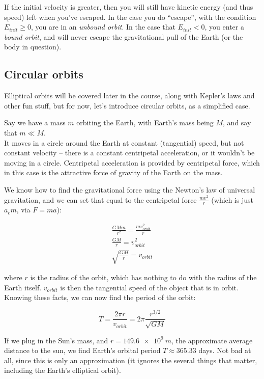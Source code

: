 If the initial velocity is greater, then you will still have kinetic energy (and thus speed) left when you've escaped. In the case you do ``escape'', with the condition $E_{init} \ge 0$, you are in an \emph{unbound orbit}. In the case that $E_{init} < 0$, you enter a \emph{bound orbit}, and will never escape the gravitational pull of the Earth (or the body in question).

\subsection{Circular orbits}

Elliptical orbits will be covered later in the course, along with Kepler's laws and other fun stuff, but for now, let's introduce circular orbits, as a simplified case.

Say we have a mass $m$ orbiting the Earth, with Earth's mass being $M$, and say that $m \ll M$.\\
It moves in a circle around the Earth at constant (tangential) speed, but not constant velocity -- there is a constant centripetal acceleration, or it wouldn't be moving in a circle. Centripetal acceleration is provided by centripetal force, which in this case is the attractive force of gravity of the Earth on the mass.

We know how to find the gravitational force using the Newton's law of universal gravitation, and we can set that equal to the centripetal force $\frac{m v^2}{r}$ (which is just $a_c m$, via $F = m a$):

\begin{align}
\frac{G M m}{r^2} = \frac{m v_{orbit}^2}{r}\\
\frac{G M}{r} = v_{orbit}^2\\
\sqrt{\frac{G M}{r}} = v_{orbit}
\end{align}

where $r$ is the radius of the orbit, which has nothing to do with the radius of the Earth itself. $v_{orbit}$ is then the tangential speed of the object that is in orbit. Knowing these facts, we can now find the period of the orbit:

\begin{equation}
T = \frac{2 \pi r}{v_{orbit}} = 2 \pi \frac{r^{3/2}}{\sqrt{G M}}
\end{equation}

If we plug in the Sun's mass, and $r = \SI{149.6e9}{m}$, the approximate average distance to the sun, we find Earth's orbital period $T \approx 365.33$ days. Not bad at all, since this is only an approximation (it ignores the several things that matter, including the Earth's elliptical orbit).

